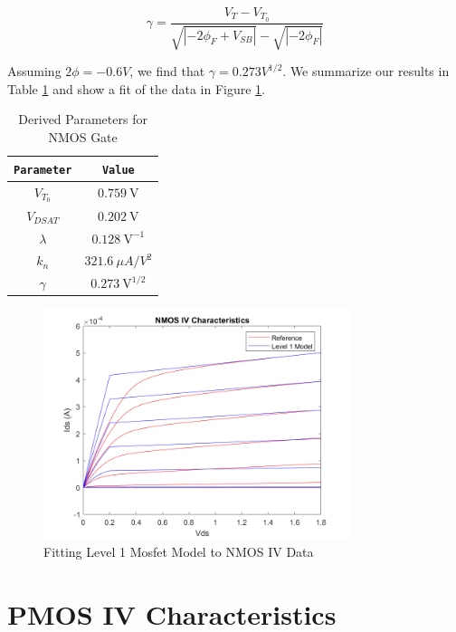 \documentclass[fleqn]{article}
\begin{document}
	\begin{equation}
		\gamma = \frac{V_T - V_{T_0}}{\sqrt{|-2\phi_F + V_{SB}|} - {\sqrt{|-2\phi_F|}}} 
	\end{equation}
	
	\noindent Assuming $2\phi = -0.6 V$, we find that $\gamma = 0.273 V^{1/2}$. We summarize our results in Table \ref{table::nmos_derived_params} and show a fit of the data in Figure \ref{fig::nmos_iv_fit}.
	
	\begin{table}[H]
	\begin{center}
	\caption{Derived Parameters for NMOS Gate}
	\label{table::nmos_derived_params}
	\begin{tabular}{| c | c |}
		\hline
		\texttt{Parameter} & \texttt{Value}\\
		\hline	
		$V_{T_0}$ & $0.759\ \text{V}$ \\
		\hline	
		$V_{DSAT}$ & $0.202\ \text{V}$ \\
		\hline	
		$\lambda$ & $0.128\ \text{V}^{-1}$\\
		\hline	
		$k_n$ & $321.6\ {\mu}A/V^2$\\
		\hline	
		$\gamma$ & $0.273\ \text{V}^{1/2}$\\
		\hline
	\end{tabular}
	\end{center}
	\end{table}
	
	\begin{figure}[H]
		\centerline{\includegraphics[width=0.8\textwidth]{nmos_iv_fit.png}}
		\caption{Fitting Level 1 Mosfet Model to NMOS IV Data}
		\label{fig::nmos_iv_fit}
	\end{figure}	
	
	\pagebreak
	\section{PMOS IV Characteristics}
	\label{appendix::pmos_iv_characteristics}
	
\end{document}
